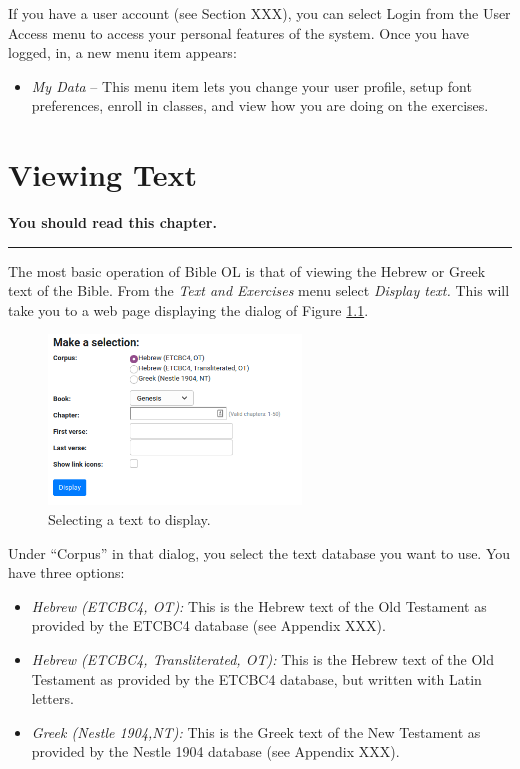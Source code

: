 \documentclass[11pt,oneside,a4paper]{memoir}
\begin{document}
If you have a user account (see Section XXX), you can select Login from the User Access menu to
access your personal features of the system. Once you have logged, in, a new menu item appears:

\begin{itemize}
\item \emph{My Data} -- This menu item lets you change your user profile, setup font preferences, enroll in
  classes, and view how you are doing on the exercises.
\end{itemize}


\chapter{Viewing Text}\label{chap-viewing-text}

\textbf{You should read this chapter.}
\plainbreak{3}

The most basic operation of Bible OL is that of viewing the Hebrew or Greek text of the Bible.
From the \emph{Text and Exercises} menu select \emph{Display text.} This will take you to a web page
displaying the dialog of Figure \ref{fig-selecttext}.
\begin{figure}
  \begin{center}
    \includegraphics[width=0.6\textwidth]{selecttext.png}
  \end{center}
  \caption{Selecting a text to display.}\label{fig-selecttext}
\end{figure}
Under ``Corpus'' in that dialog, you select the text database you want to use. You have three options:


\begin{itemize}
\item \emph{Hebrew (ETCBC4, OT):} This is the Hebrew text of the Old Testament as provided by the ETCBC4
  database (see Appendix XXX).
\item \emph{Hebrew (ETCBC4, Transliterated, OT):} This is the Hebrew text of the Old Testament as provided by
  the ETCBC4 database, but written with Latin letters.
\item \emph{Greek (Nestle 1904,NT):} This is the Greek text of the New Testament as provided by the Nestle
  1904 database (see Appendix XXX).
\end{itemize}
\end{document}
